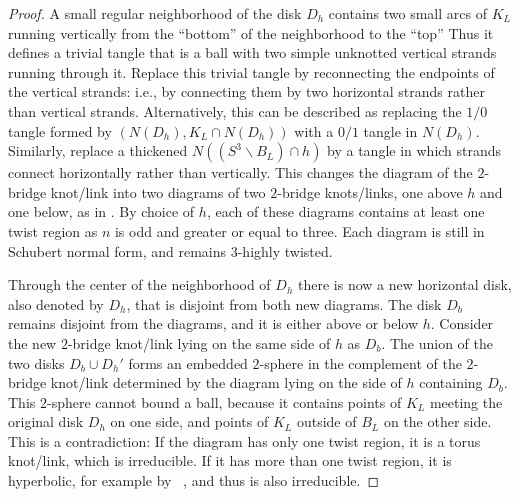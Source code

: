 \documentclass[12pt,reqno]{amsart}
\theoremstyle{plain}
\theoremstyle{definition}
\newcommand{\ssm}{\smallsetminus}
\begin{document}
\begin{proof}
A small regular neighborhood of  the disk $D_h$ contains two small arcs of $K_L$
running vertically from the ``bottom'' of the neighborhood to the ``top'' Thus it defines a 
trivial tangle that is a ball with two simple unknotted vertical strands running through it. 
Replace this trivial tangle by reconnecting the endpoints of the vertical strands: i.e.,  
by connecting them by two horizontal strands rather than vertical strands. Alternatively, 
this can be described as replacing the $1/0$ tangle formed by $(N(D_h),K_L\cap N(D_h))$ 
with a $0/1$ tangle in $N(D_h)$. Similarly, replace a thickened $N((S^3\ssm B_L)\cap h)$ 
by a tangle in which strands connect horizontally rather than vertically. This changes 
the diagram of the $2$-bridge knot/link into two diagrams of two $2$-bridge knots/links, 
one above $h$ and one below, as in . By choice of $h$, each 
of these diagrams contains at least one twist region as $n$ is odd and greater or equal 
to three. Each diagram is still in Schubert normal form, and remains $3$-highly twisted. 

Through the center of the neighborhood of $D_h$ there is now a new  horizontal disk, also 
denoted by $D_h$, that is disjoint from both new diagrams. The disk $D_b$ remains disjoint 
from the diagrams, and it is either above or below $h$. Consider the new $2$-bridge 
knot/link  lying on the same side of $h$ as $D_b$. The union of the two disks 
$D_b\cup D_h'$  forms an embedded $2$-sphere in the complement of the $2$-bridge 
knot/link determined  by the diagram lying on the side of $h$  containing $D_b$. 
This $2$-sphere cannot bound a ball, because it contains points of $K_L$ 
meeting the original disk $D_h$ on one side, and points of $K_L$ outside of $B_L$
on the other side. This is a contradiction: If the diagram has only one twist 
region, it is a torus knot/link, which is irreducible. If it has more than one 
twist region, it is hyperbolic, for example by ~\cite{LMP}, and thus is 
also irreducible.

\vskip7pt


\end{proof}
\end{document}
